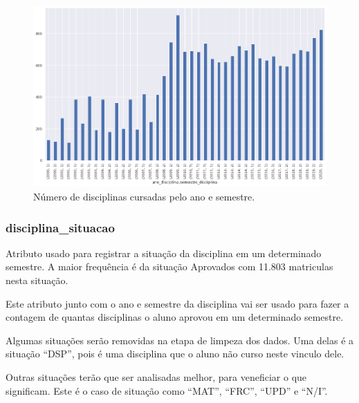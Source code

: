 \documentclass[diss,capa]{texufpel}
\begin{document}
\begin{figure}[htbp]
\centering \includegraphics[scale=.41]{imagens/ano-semestre-disciplina.png}
\caption{Número de disciplinas cursadas pelo ano e semestre.}
\label{fig:nr-disciplinas-cursadas-ano-semestre}
\end{figure}

\subsubsection{disciplina\_situacao}

Atributo usado para registrar a situação da disciplina em um determinado semestre.
A maior frequência é da situação Aprovados com 11.803 matriculas nesta situação.

Este atributo junto com o ano e semestre da disciplina vai ser usado para fazer a contagem de quantas disciplinas o aluno aprovou em um determinado semestre. 

Algumas situações serão removidas na etapa de limpeza dos dados.
Uma delas é a situação ``DSP'', pois é uma disciplina que o aluno não curso neste vinculo dele.

Outras situações terão que ser analisadas melhor, para veneficiar o que significam. Este é o caso de situação como ``MAT'', ``FRC'', ``UPD'' e ``N/I''.
\end{document}
